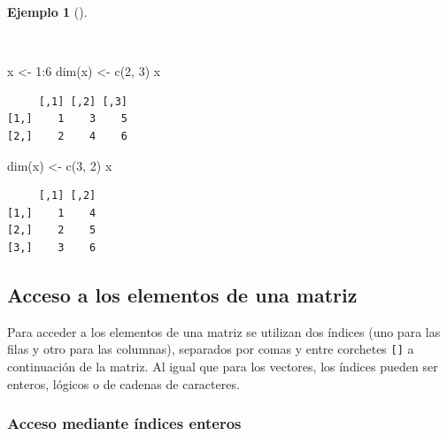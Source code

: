 \documentclass[
  a4paper,
]{scrreport}
\newenvironment{Shaded}{\begin{snugshade}}{\end{snugshade}}
\newcommand{\DecValTok}[1]{\textcolor[rgb]{0.68,0.00,0.00}{#1}}
\newcommand{\FunctionTok}[1]{\textcolor[rgb]{0.28,0.35,0.67}{#1}}
\newcommand{\NormalTok}[1]{\textcolor[rgb]{0.00,0.23,0.31}{#1}}
\newcommand{\OtherTok}[1]{\textcolor[rgb]{0.00,0.23,0.31}{#1}}
\newcommand{\SpecialCharTok}[1]{\textcolor[rgb]{0.37,0.37,0.37}{#1}}
\theoremstyle{definition}
\theoremstyle{definition}
\newtheorem{example}{Ejemplo}[chapter]
\theoremstyle{remark}
\begin{document}
\begin{example}[]\protect\hypertarget{exm-modificacion-dimensiones-matriz}{}\label{exm-modificacion-dimensiones-matriz}

~

\begin{Shaded}
\begin{Highlighting}[]
\NormalTok{x }\OtherTok{\textless{}{-}} \DecValTok{1}\SpecialCharTok{:}\DecValTok{6}
\FunctionTok{dim}\NormalTok{(x) }\OtherTok{\textless{}{-}} \FunctionTok{c}\NormalTok{(}\DecValTok{2}\NormalTok{, }\DecValTok{3}\NormalTok{)}
\NormalTok{x}
\end{Highlighting}
\end{Shaded}

\begin{verbatim}
     [,1] [,2] [,3]
[1,]    1    3    5
[2,]    2    4    6
\end{verbatim}

\begin{Shaded}
\begin{Highlighting}[]
\FunctionTok{dim}\NormalTok{(x) }\OtherTok{\textless{}{-}} \FunctionTok{c}\NormalTok{(}\DecValTok{3}\NormalTok{, }\DecValTok{2}\NormalTok{)}
\NormalTok{x}
\end{Highlighting}
\end{Shaded}

\begin{verbatim}
     [,1] [,2]
[1,]    1    4
[2,]    2    5
[3,]    3    6
\end{verbatim}

\end{example}

\subsection{Acceso a los elementos de una
matriz}\label{acceso-a-los-elementos-de-una-matriz}

Para acceder a los elementos de una matriz se utilizan dos índices (uno
para las filas y otro para las columnas), separados por comas y entre
corchetes \texttt{{[}{]}} a continuación de la matriz. Al igual que para
los vectores, los índices pueden ser enteros, lógicos o de cadenas de
caracteres.

\subsubsection{Acceso mediante índices
enteros}\label{acceso-mediante-uxedndices-enteros}
\end{document}
